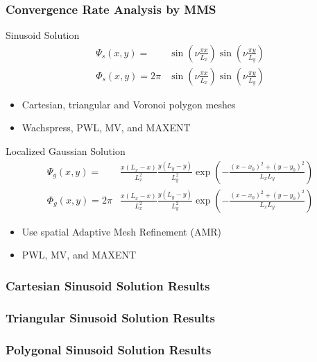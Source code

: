 \documentclass[compress,10pt]{beamer}
\begin{document}
\begin{frame}[t]
{
\frametitle{Convergence Rate Analysis by MMS}
{\small
\begin{block}{Sinusoid Solution}
\begin{equation*}
\begin{aligned}
\Psi_s (x,y) = &\sin(\nu  \frac{\pi x}{L_x}) \sin(\nu  \frac{\pi y}{L_y}) \\ 
\Phi_s (x,y) = 2 \pi &\sin(\nu  \frac{\pi x}{L_x}) \sin(\nu  \frac{\pi y}{L_y})
\end{aligned} 
\end{equation*}
\begin{itemize}
\item Cartesian, triangular and Voronoi polygon meshes
\item Wachspress, PWL, MV, and MAXENT
\end{itemize}
\end{block}
\begin{block}{Localized Gaussian Solution}
\begin{equation*}
\begin{aligned}
\Psi_g (x,y) = & \frac{x (L_x - x)}{L_x^2} \frac{y (L_y - y)}{L_y^2} \exp(-\frac{(x-x_0)^2 + (y-y_0)^2}{L_x L_y}) \\ 
\Phi_g (x,y) = 2 \pi &\frac{x (L_x - x)}{L_x^2} \frac{y (L_y - y)}{L_y^2} \exp(-\frac{(x-x_0)^2 + (y-y_0)^2}{L_x L_y})
\end{aligned} 
\end{equation*}
\begin{itemize}
\item Use spatial Adaptive Mesh Refinement (AMR)
\item PWL, MV, and MAXENT
\end{itemize}
\end{block}
}
}
{
\frametitle{Cartesian Sinusoid Solution Results}
}
{
\frametitle{Triangular Sinusoid Solution Results}
}
{
\frametitle{Polygonal Sinusoid Solution Results}
}
\end{frame}
\end{document}
